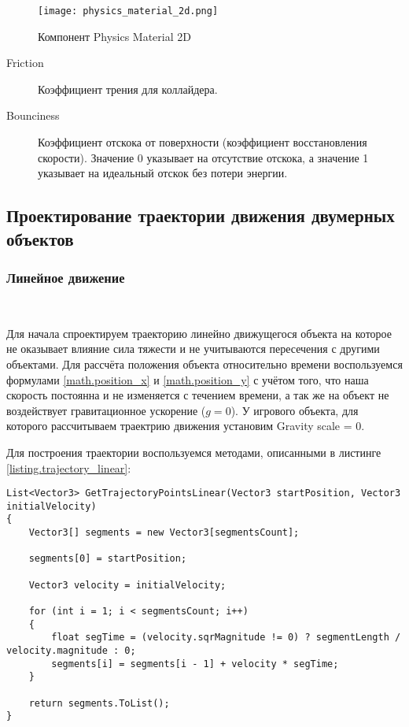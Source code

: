 \begin{figure}[h]
	\noindent\centering
	\texttt{[image: physics\_material\_2d.png]}  
	\caption{Компонент Physics Material 2D}
	\label{fig:domain:sec_project:physics_material_2d}
\end{figure}

\begin{description}
	\item[Friction] Коэффициент трения для коллайдера.
	\item[Bounciness] Коэффициент отскока от поверхности (коэффициент восстановления скорости). Значение 0 указывает на отсутствие отскока, а значение 1 указывает на идеальный отскок без потери энергии.
\end{description}


\subsection{Проектирование траектории движения двумерных объектов}

\subsubsection{Линейное движение}~

Для начала спроектируем траекторию линейно движущегося объекта на которое не оказывает влияние сила тяжести и не учитываются пересечения с другими объектами. Для рассчёта положения объекта относительно времени воспользуемся формулами \ref{math.position_x} и \ref{math.position_y} с учётом того, что наша скорость постоянна и не изменяется с течением времени, а так же на объект не воздействует гравитационное ускорение ($g = 0$). У игрового объекта, для которого рассчитываем траектрию движения установим Gravity scale = 0.

Для построения траектории воспользуемся методами, описанными в листинге \ref{listing.trajectory_linear}:

\begin{lstlisting}[style=fsharpstyle, caption={Построение траектории линейно движущегося объекта без воздействия силы тяжести и отскоков}, label=listing.trajectory_linear]
List<Vector3> GetTrajectoryPointsLinear(Vector3 startPosition, Vector3 initialVelocity)
{
	Vector3[] segments = new Vector3[segmentsCount];
		
	segments[0] = startPosition;
		
	Vector3 velocity = initialVelocity;
		
	for (int i = 1; i < segmentsCount; i++)
	{
		float segTime = (velocity.sqrMagnitude != 0) ? segmentLength / velocity.magnitude : 0;
		segments[i] = segments[i - 1] + velocity * segTime;
	}
	
	return segments.ToList();
}
\end{lstlisting}


